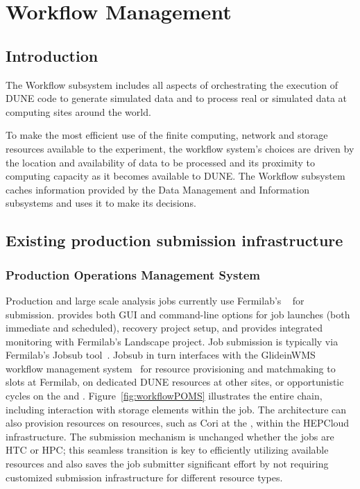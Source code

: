 \documentclass[../main-v1.tex]{subfiles}
\begin{document}
\chapter{Workflow Management }
\label{ch:wkflow}

\section{Introduction }
\label{sec:flow:intro} 

The Workflow subsystem includes all aspects of orchestrating the execution of DUNE code to generate simulated data and to process real or simulated data at computing sites around the world. 

To make the most efficient use of the finite computing, network and storage resources available to the experiment, the workflow system's choices are driven by the location and availability of data to be processed and its proximity to computing capacity as it becomes available to DUNE. The Workflow subsystem caches information provided by the Data Management and Information subsystems and uses it to make its decisions.


\section{Existing production submission infrastructure }
\label{sec:current}

\subsection{Production Operations Management System}
\label{subsec:jobsub}

Production and large scale analysis jobs currently use Fermilab's ~\cite{Mengel:2020wev} for submission.  provides both GUI and command-line options for job launches (both immediate and scheduled), recovery project setup, and provides integrated monitoring with Fermilab's Landscape project. Job submission is typically via Fermilab's Jobsub tool~\cite{box2014fife}. Jobsub in
turn interfaces with the GlideinWMS workflow management system~\cite{sfiligoi2009pilot} for resource provisioning and matchmaking to slots at Fermilab, on dedicated DUNE resources at other sites, or opportunistic cycles on the    and . Figure~\ref{fig:workflowPOMS} illustrates the entire chain, including interaction with storage elements within the job.
The architecture can also provision resources on  resources, such as Cori at the , within the HEPCloud~\cite{mhashilkar2019hepcloud} infrastructure. The submission mechanism is unchanged whether the jobs are HTC or HPC; this seamless transition is key to efficiently utilizing available resources and also saves the job submitter significant effort by not requiring customized submission infrastructure for different resource types.
\end{document}
